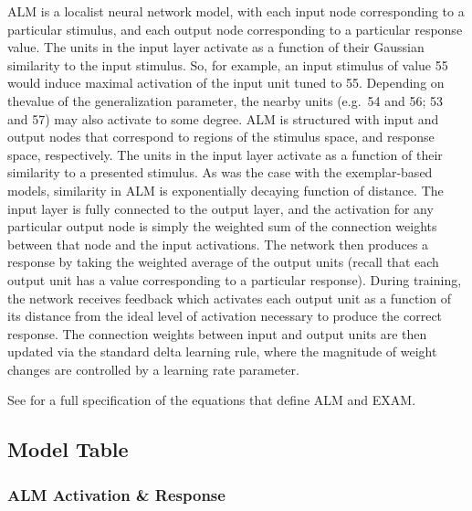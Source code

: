 \documentclass[
  letterpaper,
  DIV=11,
  numbers=noendperiod,
  oneside]{scrartcl}
\begin{document}
ALM is a localist neural network model, with each input node
corresponding to a particular stimulus, and each output node
corresponding to a particular response value. The units in the input
layer activate as a function of their Gaussian similarity to the input
stimulus. So, for example, an input stimulus of value 55 would induce
maximal activation of the input unit tuned to 55. Depending on thevalue
of the generalization parameter, the nearby units (e.g.~54 and 56; 53
and 57) may also activate to some degree. ALM is structured with input
and output nodes that correspond to regions of the stimulus space, and
response space, respectively. The units in the input layer activate as a
function of their similarity to a presented stimulus. As was the case
with the exemplar-based models, similarity in ALM is exponentially
decaying function of distance. The input layer is fully connected to the
output layer, and the activation for any particular output node is
simply the weighted sum of the connection weights between that node and
the input activations. The network then produces a response by taking
the weighted average of the output units (recall that each output unit
has a value corresponding to a particular response). During training,
the network receives feedback which activates each output unit as a
function of its distance from the ideal level of activation necessary to
produce the correct response. The connection weights between input and
output units are then updated via the standard delta learning rule,
where the magnitude of weight changes are controlled by a learning rate
parameter.

See for a full specification of the equations that define ALM and EXAM.

\newpage{}

\subsection{Model Table}\label{model-table}

\subsubsection{ALM Activation \&
Response}\label{alm-activation-response}
\end{document}
